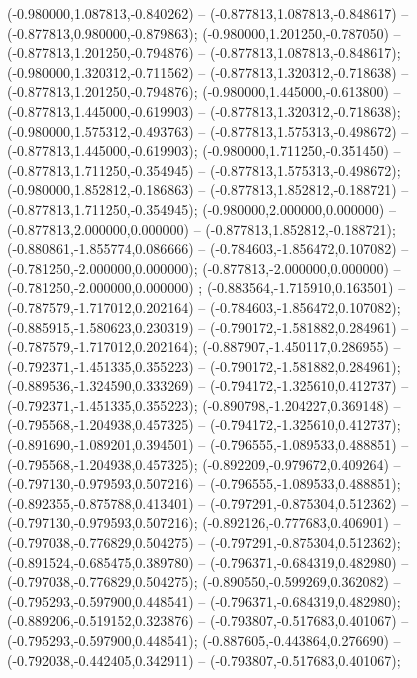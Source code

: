  (-0.980000,1.087813,-0.840262) -- (-0.877813,1.087813,-0.848617) -- (-0.877813,0.980000,-0.879863);
 (-0.980000,1.201250,-0.787050) -- (-0.877813,1.201250,-0.794876) -- (-0.877813,1.087813,-0.848617);
 (-0.980000,1.320312,-0.711562) -- (-0.877813,1.320312,-0.718638) -- (-0.877813,1.201250,-0.794876);
 (-0.980000,1.445000,-0.613800) -- (-0.877813,1.445000,-0.619903) -- (-0.877813,1.320312,-0.718638);
 (-0.980000,1.575312,-0.493763) -- (-0.877813,1.575313,-0.498672) -- (-0.877813,1.445000,-0.619903);
 (-0.980000,1.711250,-0.351450) -- (-0.877813,1.711250,-0.354945) -- (-0.877813,1.575313,-0.498672);
 (-0.980000,1.852812,-0.186863) -- (-0.877813,1.852812,-0.188721) -- (-0.877813,1.711250,-0.354945);
 (-0.980000,2.000000,0.000000) -- (-0.877813,2.000000,0.000000) -- (-0.877813,1.852812,-0.188721);
 (-0.880861,-1.855774,0.086666) -- (-0.784603,-1.856472,0.107082) -- (-0.781250,-2.000000,0.000000);
 (-0.877813,-2.000000,0.000000) -- (-0.781250,-2.000000,0.000000) ;
 (-0.883564,-1.715910,0.163501) -- (-0.787579,-1.717012,0.202164) -- (-0.784603,-1.856472,0.107082);
 (-0.885915,-1.580623,0.230319) -- (-0.790172,-1.581882,0.284961) -- (-0.787579,-1.717012,0.202164);
 (-0.887907,-1.450117,0.286955) -- (-0.792371,-1.451335,0.355223) -- (-0.790172,-1.581882,0.284961);
 (-0.889536,-1.324590,0.333269) -- (-0.794172,-1.325610,0.412737) -- (-0.792371,-1.451335,0.355223);
 (-0.890798,-1.204227,0.369148) -- (-0.795568,-1.204938,0.457325) -- (-0.794172,-1.325610,0.412737);
 (-0.891690,-1.089201,0.394501) -- (-0.796555,-1.089533,0.488851) -- (-0.795568,-1.204938,0.457325);
 (-0.892209,-0.979672,0.409264) -- (-0.797130,-0.979593,0.507216) -- (-0.796555,-1.089533,0.488851);
 (-0.892355,-0.875788,0.413401) -- (-0.797291,-0.875304,0.512362) -- (-0.797130,-0.979593,0.507216);
 (-0.892126,-0.777683,0.406901) -- (-0.797038,-0.776829,0.504275) -- (-0.797291,-0.875304,0.512362);
 (-0.891524,-0.685475,0.389780) -- (-0.796371,-0.684319,0.482980) -- (-0.797038,-0.776829,0.504275);
 (-0.890550,-0.599269,0.362082) -- (-0.795293,-0.597900,0.448541) -- (-0.796371,-0.684319,0.482980);
 (-0.889206,-0.519152,0.323876) -- (-0.793807,-0.517683,0.401067) -- (-0.795293,-0.597900,0.448541);
 (-0.887605,-0.443864,0.276690) -- (-0.792038,-0.442405,0.342911) -- (-0.793807,-0.517683,0.401067);
